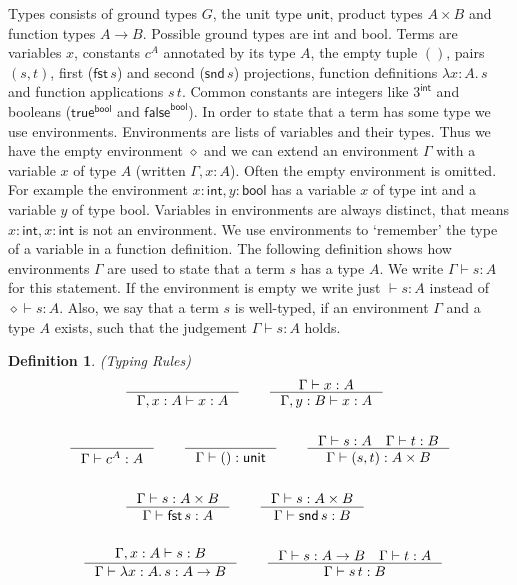 \documentclass{article}
\newtheorem{defn}{Definition}[section]
\newcommand{\type}{\vdash}
\newcommand{\unit}{\mathsf{unit}}
\newcommand{\fst}{\mathsf{fst}\,}
\newcommand{\snd}{\mathsf{snd}\,}
\newcommand{\eenv}{\diamond}
\begin{document}
Types consists of ground types $G$, the unit type $\unit$, product types $A \times B$ and function types $A \to B$.
Possible ground types are \textsf{int} and \textsf{bool}.
Terms are variables $x$, constants $c^A$ annotated by its type $A$, the empty tuple $()$, pairs $(s, t)$, first ($\fst s$) and second ($\snd s$) projections,
function definitions $\lambda x: A.\, s$ and function applications $s\,t$.
Common constants are integers like $3^{\mathsf{int}}$ and booleans ($\mathsf{true}^{\mathsf{bool}}$ and $\mathsf{false}^{\mathsf{bool}}$).
In order to state that a term has some type we use environments.
Environments are lists of variables and their types.
Thus we have the empty environment $\eenv$ and we can extend an environment $\Gamma$ with a variable $x$ of type $A$ (written $\Gamma, x: A$).
Often the empty environment is omitted.
For example the environment $x: \mathsf{int}, y: \mathsf{bool}$ has a variable $x$ of type \textsf{int} and a variable $y$ of type \textsf{bool}.
Variables in environments are always distinct, that means $x: \mathsf{int}, x: \mathsf{int}$ is not an environment.
We use environments to `remember' the type of a variable in a function definition.
The following definition shows how environments $\Gamma$ are used to state that a term $s$ has a type $A$.
We write $\Gamma \type s: A$ for this statement.
If the environment is empty we write just $\type s: A$ instead of $\eenv \type s: A$.
Also, we say that a term $s$ is well-typed, if an  environment $\Gamma$ and a type $A$ exists, such that the judgement $\Gamma \type s: A$ holds.

\begin{defn}{(Typing Rules)}
    \label{def:type}
    \begin{align*}
        &\qquad\qquad \inference{}{\Gamma, x: A \type x: A} \qquad \inference{\Gamma \type x : A}{\Gamma , y: B \type x: A}\\
        \\
        &\inference{}{\Gamma \type c^A: A} \qquad \inference{}{\Gamma \type () : \mathsf{unit}}\qquad
        \inference{\Gamma \type s: A \quad \Gamma \type t:B}{\Gamma \type (s, t) : A \times B}\\
        \\
        & \qquad\qquad \inference{\Gamma \type s : A \times B}{\Gamma \type \mathsf{fst}\,s: A} \qquad
        \inference{\Gamma \type s : A \times B}{\Gamma \type \mathsf{snd}\,s: B}\\
        \\
        & \quad \inference{\Gamma, x:A \type s: B}{\Gamma \type \lambda x: A.\, s: A \to B} \qquad
        \inference{\Gamma \type s: A \to B \quad \Gamma \type t: A}{\Gamma \type s\,t: B}
    \end{align*}
\end{defn}
\end{document}
